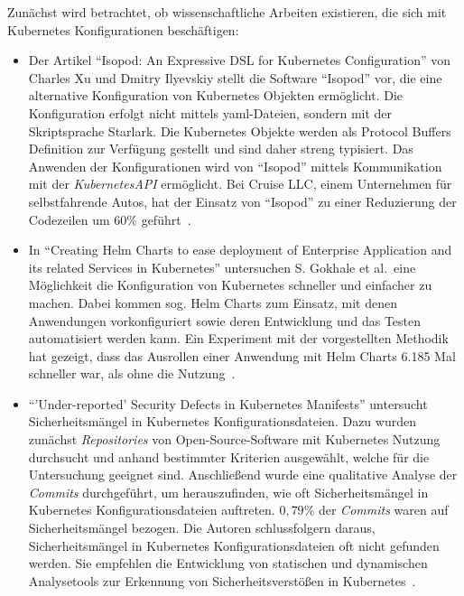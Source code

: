 Zunächst wird betrachtet, ob wissenschaftliche Arbeiten existieren, die sich mit Kubernetes Konfigurationen beschäftigen:
\begin{itemize}
      \item Der Artikel ``Isopod: An Expressive DSL for Kubernetes Configuration'' von Charles Xu und Dmitry Ilyevskiy stellt die
            Software ``Isopod'' vor, die eine alternative Konfiguration von Kubernetes Objekten ermöglicht. Die Konfiguration erfolgt nicht mittels \ac{yaml}-Dateien,
            sondern mit der Skriptsprache Starlark. Die Kubernetes Objekte werden als Protocol Buffers Definition zur Verfügung gestellt und sind daher streng typisiert.
            Das Anwenden der Konfigurationen wird von ``Isopod'' mittels Kommunikation mit der \textit{KubernetesAPI} ermöglicht.
            Bei Cruise LLC, einem Unternehmen für selbstfahrende Autos, hat der Einsatz von ``Isopod'' zu einer Reduzierung der Codezeilen um $60\%$ geführt~\cite{10.1145/3357223.3365759}.
      \item In ``Creating Helm Charts to ease deployment of Enterprise Application and its related Services in Kubernetes'' untersuchen
            S. Gokhale et al.\ eine Möglichkeit die Konfiguration von Kubernetes schneller und einfacher zu machen. Dabei kommen sog. Helm Charts zum Einsatz,
            mit denen Anwendungen vorkonfiguriert sowie deren Entwicklung und das Testen automatisiert werden kann. Ein Experiment mit der vorgestellten Methodik
            hat gezeigt, dass das Ausrollen einer Anwendung mit Helm Charts 6.185 Mal schneller war, als ohne die Nutzung~\cite{9776450}.
      \item ``'Under-reported' Security Defects in Kubernetes Manifests'' untersucht Sicherheitsmängel in Kubernetes Konfigurationsdateien.
            Dazu wurden zunächst \textit{Repositories} von Open-Source-Software mit Kubernetes Nutzung durchsucht und anhand bestimmter Kriterien ausgewählt, welche für
            die Untersuchung geeignet sind. Anschließend wurde eine qualitative Analyse der \textit{Commits} durchgeführt, um herauszufinden, wie oft Sicherheitsmängel in Kubernetes
            Konfigurationsdateien auftreten. $0,79\%$ der \textit{Commits} waren auf Sicherheitsmängel bezogen. Die Autoren schlussfolgern daraus,
            Sicherheitsmängel in Kubernetes Konfigurationsdateien oft nicht gefunden werden. Sie empfehlen die Entwicklung von statischen und dynamischen Analysetools
            zur Erkennung von Sicherheitsverstößen in Kubernetes~\cite{9476056}.
\end{itemize}

